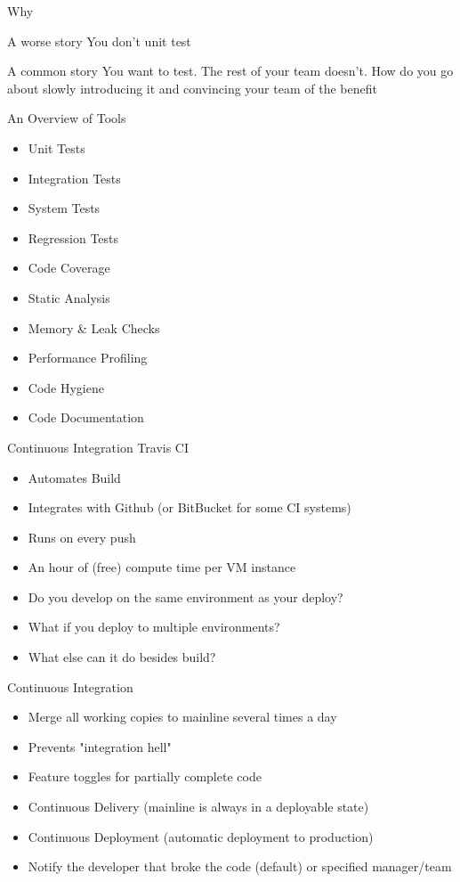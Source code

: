 \documentclass{beamer}
\begin{document}
\begin{frame}{Why}
	\begin{block}{A worse story}
		You don't unit test
	\end{block}
	\begin{block}{A common story}
		You want to test. The rest of your team doesn't. How do you go about slowly
		introducing it and convincing your team of the benefit
	\end{block}
\end{frame}

\begin{frame}{An Overview of Tools}
	\begin{itemize}
		\item Unit Tests
		\item Integration Tests
		\item System Tests
		\item Regression Tests
		\item Code Coverage
		\item Static Analysis
		\item Memory \& Leak Checks
		\item Performance Profiling
		\item Code Hygiene
		\item Code Documentation
	\end{itemize}
\end{frame}

\begin{frame}{Continuous Integration}
	Travis CI
	\begin{itemize}
		\item Automates Build
		\item Integrates with Github (or BitBucket for some CI systems)
		\item Runs on every push
		\item An hour of (free) compute time per VM instance
		\item Do you develop on the same environment as your deploy?
		\item What if you deploy to multiple environments?
		\item What else can it do besides build?
	\end{itemize}
\end{frame}

\begin{frame}{Continuous Integration}
	\begin{itemize}
		\item Merge all working copies to mainline several times a day
		\item Prevents "integration hell"
		\item Feature toggles for partially complete code
		\item Continuous Delivery (mainline is always in a deployable state)
		\item Continuous Deployment (automatic deployment to production)
		\item Notify the developer that broke the code (default) or specified manager/team
	\end{itemize}
\end{frame}
\end{document}
